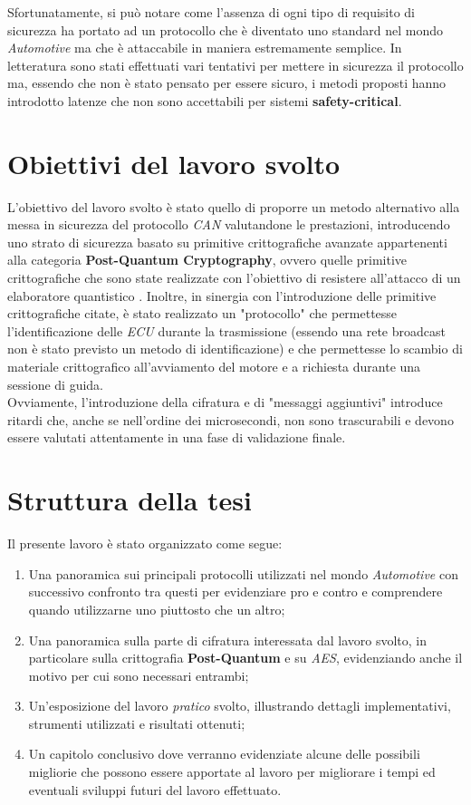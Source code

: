 Sfortunatamente, si può notare come l'assenza di ogni tipo di requisito di sicurezza ha portato ad un protocollo che è diventato uno standard nel mondo \emph{Automotive} ma che è attaccabile in maniera estremamente semplice. In letteratura sono stati effettuati vari tentativi per mettere in sicurezza il protocollo ma, essendo che non è stato pensato per essere sicuro, i metodi proposti hanno introdotto latenze che non sono accettabili per sistemi \textbf{safety-critical}. \cite{bozdal_samie_jennions_2018}

\section{Obiettivi del lavoro svolto} %
L'obiettivo del lavoro svolto è stato quello di proporre un metodo alternativo alla messa in sicurezza del protocollo \emph{CAN} valutandone le prestazioni, introducendo uno strato di sicurezza basato su primitive crittografiche avanzate appartenenti alla categoria \textbf{Post-Quantum Cryptography}, ovvero quelle primitive crittografiche che sono state realizzate con l'obiettivo di resistere all'attacco di un elaboratore quantistico \cite{wikipedia_pqc}. Inoltre, in sinergia con l'introduzione delle primitive crittografiche citate, è stato realizzato un "protocollo" che permettesse l'identificazione delle \emph{ECU} durante la trasmissione (essendo una rete broadcast non è stato previsto un metodo di identificazione) e che permettesse lo scambio di materiale crittografico all'avviamento del motore e a richiesta durante una sessione di guida. \\
Ovviamente, l'introduzione della cifratura e di "messaggi aggiuntivi" introduce ritardi che, anche se nell'ordine dei microsecondi, non sono trascurabili e devono essere valutati attentamente in una fase di validazione finale.

\section{Struttura della tesi}
Il presente lavoro è stato organizzato come segue:
\begin{enumerate}
    \item Una panoramica sui principali protocolli utilizzati nel mondo \emph{Automotive} con successivo confronto tra questi per evidenziare pro e contro e comprendere quando utilizzarne uno piuttosto che un altro;
    \item Una panoramica sulla parte di cifratura interessata dal lavoro svolto, in particolare sulla crittografia \textbf{Post-Quantum} e su \emph{AES}, evidenziando anche il motivo per cui sono necessari entrambi;
    \item Un'esposizione del lavoro \emph{pratico} svolto, illustrando dettagli implementativi, strumenti utilizzati e risultati ottenuti;
    \item Un capitolo conclusivo dove verranno evidenziate alcune delle possibili migliorie che possono essere apportate al lavoro per migliorare i tempi ed eventuali sviluppi futuri del lavoro effettuato.
\end{enumerate}